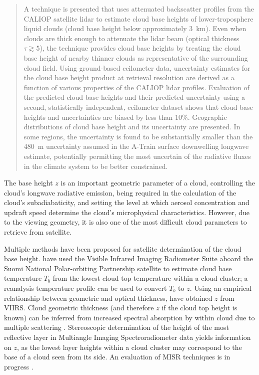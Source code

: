 \documentclass[essd,manuscript]{copernicus}\usepackage[]{graphicx}\usepackage[]{color}
\newcommand\CBH{\ensuremath{z}}
\begin{document}
\begin{abstract}
  A technique is presented that uses attenuated backscatter profiles from the
  CALIOP satellite lidar to estimate cloud base heights of lower-troposphere
  liquid clouds (cloud base height below approximately 3~\unit{km}).  Even when clouds are
  thick enough to attenuate the lidar beam (optical thickness $\tau \gtrsim 5$),
  the technique provides cloud base heights by treating the cloud base height of
  nearby thinner clouds as representative of the surrounding cloud field.  Using
  ground-based ceilometer data, uncertainty estimates for the cloud base height
  product at retrieval resolution are derived as a function of various
  properties of the CALIOP lidar profiles.  Evaluation of the predicted cloud
  base heights and their predicted uncertainty using a second, statistically
  independent, ceilometer dataset shows that cloud base heights and
  uncertainties are biased by less than 10\%.  Geographic distributions of cloud
  base height and its uncertainty are presented.  In some regions, the
  uncertainty is found to be substantially smaller than the 480~\unit{m}
  uncertainty assumed in the A-Train surface downwelling longwave estimate,
  potentially permitting the most uncertain of the radiative fluxes in the
  climate system to be better constrained.
\end{abstract}

\introduction  %
\label{sec:intro}
The base height \CBH{} is an important geometric parameter of a cloud,
controlling the cloud's longwave radiative emission, being required in the
calculation of the cloud's subadiabaticity, and setting the level at which
aerosol concentration and updraft speed determine the cloud's microphysical
characteristics.  However, due to the viewing geometry, it is also one of the
most difficult cloud parameters to retrieve from satellite.

Multiple methods have been proposed for satellite determination of the cloud
base height.  \cite{Zhu2014} have used the Visible Infrared Imaging Radiometer Suite
aboard the Suomi National Polar-orbiting Partnership satellite
\citep[VIIRS,][]{Cao2014} to estimate cloud base temperature $T_b$ from the
lowest cloud top temperature within a cloud cluster; a reanalysis temperature
profile can be used to convert $T_b$ to \CBH{}.  Using an empirical relationship
between geometric and optical thickness, \cite{Fitch2016} have obtained \CBH{} from
VIIRS.  Cloud geometric thickness (and therefore \CBH{} if the cloud top height is
known) can be inferred from increased spectral absorption by  within cloud
due to multiple scattering \citep{Kokhanovsky2005,Lelli2018}.  Stereoscopic determination of
the height of the most reflective layer \citep{Naud2005,Naud2007} in Multiangle
Imaging Spectroradiometer data \citep[MISR,][]{Diner1998} yields information on
\CBH{}, as the lowest layer heights within a cloud cluster may correspond to the
base of a cloud seen from its side.  An evaluation of MISR
  techniques is in progress \citep{Boehm2017}.
\end{document}
